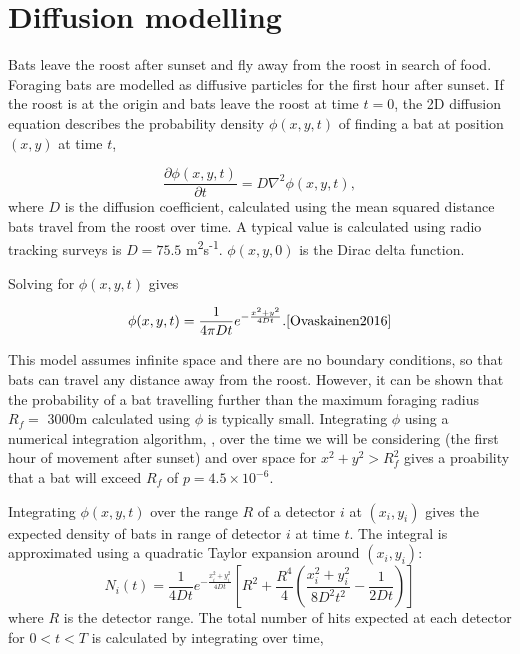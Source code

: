 \section{Diffusion modelling}

Bats leave the roost after sunset and fly away from the roost in search of food.
Foraging bats are modelled as diffusive particles for the first hour after
sunset. If the roost is at the origin and bats leave the roost at time $t =0$,
the 2D diffusion equation describes the probability density $\phi(x,y,t)$ of
finding a bat at position $(x,y)$ at time $t$,

\begin{equation}
  \frac{\partial \phi(x,y,t)}{\partial t} = D \nabla^2 \phi(x,y,t) ,
  \nonumber
\end{equation}
%
where $D$ is the diffusion coefficient, calculated using the mean squared distance bats travel from the roost over time. A typical value is calculated using radio tracking surveys is $D = 75.5$ m\textsuperscript{2}s\textsuperscript{-1}. $\phi(x,y,0)$ is
the Dirac delta function.

Solving for $\phi(x,y,t)$ gives

\begin{equation}
  \phi(x,y,t) = \frac{1}{4 \pi D t} e^{-\frac{x^2 + y^2}{4Dt}}. \cite{Ovaskainen2016}
  \nonumber
\end{equation}

This model assumes infinite space and there are no boundary conditions, so that bats can travel any distance away from the roost. However, it can be shown that the probability of a bat travelling further than the maximum foraging radius $R_f =$ 3000m calculated using $\phi$ is typically small. Integrating $\phi$ using a numerical integration algorithm, \cite{Berntsen1991}, over the time we will be considering (the first hour of movement after sunset) and over space for $x^2 + y^2 > R_f^2$ gives a proability that a bat will exceed $R_f$ of $p = 4.5 \times 10^{-6}$.

Integrating $\phi(x,y,t)$ over the range $R$ of a detector $i$ at $(x_i, y_i)$ gives
the expected density of bats in range of detector $i$ at time $t$. The
integral is approximated using a quadratic Taylor expansion around $(x_i, y_i)$:
\begin{equation}
  N_i(t) = \frac{1}{4Dt} e^{-\frac{x_i^2 + y_i^2}{4Dt}} \left[ R^2 + \frac{R^4}{4} \left( \frac{x_i^2 + y_i^2}{8D^2t^2} - \frac{1}{2Dt} \right)\right]
\end{equation}
%
where $R$ is the detector range. The total number of hits expected at each
detector for $0 < t < T$ is calculated by integrating over time,

